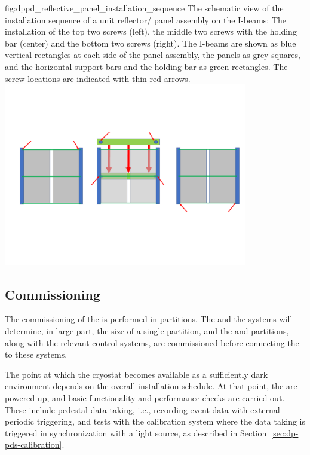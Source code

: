 \begin{dunefigure}{fig:dppd_reflective_panel_installation_sequence}
{The schematic view of the installation sequence of a unit reflector/ panel assembly on the  I-beams: The installation of the top two screws (left), the middle two screws with the holding bar (center) and the bottom two screws (right). The I-beams are shown as blue vertical rectangles at each side of the panel assembly, the panels as grey squares, and the horizontal support bars and the holding bar as green rectangles. The screw locations are indicated with thin red arrows.}
\includegraphics[width=0.8\textwidth]{graphics/dppd_reflective_panel_installation_sequence}
\end{dunefigure}

\subsection{Commissioning}
\label{subsec:dp-pds-commissioning}

The commissioning of the  is performed in partitions. The  and the  systems will determine, in large part, the size of a single partition, and the  and  partitions, along with the relevant control systems,  are commissioned before connecting the  to these systems.

The point at which the cryostat becomes available as a sufficiently dark environment depends on the overall installation schedule. At that point, the  are powered up, and basic functionality and performance checks are carried out. These include pedestal data taking, i.e., recording event data with external periodic triggering, and tests with the calibration system where the data taking is triggered in synchronization with a light source, as described in Section~\ref{sec:dp-pds-calibration}.

